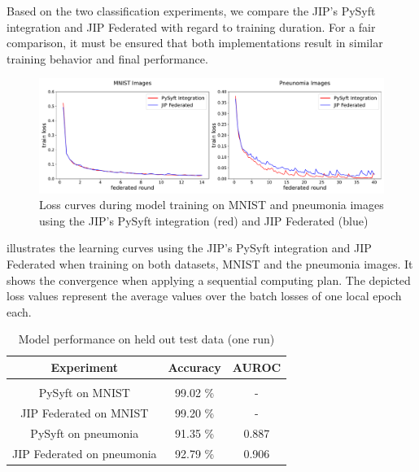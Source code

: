 Based on the two classification experiments, we compare the JIP's PySyft integration and JIP Federated with regard to training duration. For a fair comparison, it must be ensured that both implementations result in similar training behavior and final performance.

\begin{figure}[htbp]
    \centerline{\includegraphics[width=1.0\textwidth]{1_Figures/RuntimeExperiments_horizontal.pdf}}
    \caption[Loss curves during model training on MNIST and pneunomia images]{Loss curves during model training on MNIST and pneumonia images using the JIP's PySyft integration (red) and JIP Federated (blue)}
\label{fig:RuntimeExp}
\end{figure}

 illustrates the learning curves using the JIP's PySyft integration and JIP Federated when training on both datasets, MNIST and the pneumonia images. It shows the convergence when applying a sequential computing plan. The depicted loss values represent the average values over the batch losses of one local epoch each.

\begin{table}[htbp]
  \centering
  \begin{tabular}{ccc}
  Experiment & Accuracy & AUROC \\
  \hline \\[-2.5ex] %
  PySyft on MNIST               & 99.02 \% & - \\
  JIP Federated on MNIST        & 99.20 \% & - \\
  PySyft on pneumonia           & 91.35 \% & 0.887 \\
  JIP Federated on pneumonia    & 92.79 \% & 0.906 \\
 \end{tabular}
 \caption[Model performance on held out test data]{Model performance on held out test data (one run)}
 \label{tab:Performance}
\end{table}

